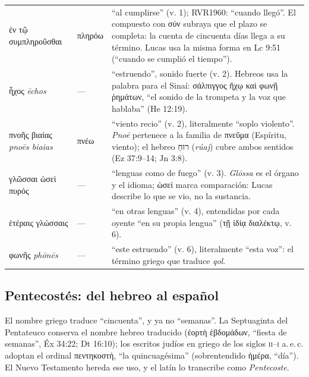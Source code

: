 \documentclass[11pt,letterpaper]{article}
\newcommand{\heb}[1]{\mbox{\foreignlanguage{hebrew}{#1}}}
\newcommand{\grc}[1]{\foreignlanguage{ancientgreek}{#1}}
\begin{document}
\begin{filologia}[Hch 2:1--6]
\begin{tabular}{@{}L{3.5cm}L{1.3cm}L{9.85cm}@{}}
\grc{ἐν τῷ συμπληροῦσθαι} & \grc{πληρόω} & ``al cumplirse'' (v. 1); RVR1960: ``cuando llegó''. El compuesto con \grc{σύν} subraya que el plazo se completa: la cuenta de cincuenta días llega a su término. Lucas usa la misma forma en Lc 9:51 (``cuando se cumplió el tiempo''). \\[2pt]
\grc{ἦχος} \emph{ēchos} & --- & ``estruendo'', sonido fuerte (v. 2). Hebreos usa la palabra para el Sinaí: \grc{σάλπιγγος ἤχῳ καὶ φωνῇ ῥημάτων}, ``el sonido de la trompeta y la voz que hablaba'' (He 12:19). \\[2pt]
\grc{πνοῆς βιαίας} \emph{pnoēs biaias} & \grc{πνέω} & ``viento recio'' (v. 2), literalmente ``soplo violento''. \emph{Pnoē} pertenece a la familia de \grc{πνεῦμα} (Espíritu, viento); el hebreo \heb{רוּחַ} (\emph{rúaj}) cubre ambos sentidos (Ez 37:9--14; Jn 3:8). \\[2pt]
\grc{γλῶσσαι ὡσεὶ πυρός} & --- & ``lenguas como de fuego'' (v. 3). \emph{Glōssa} es el órgano y el idioma; \grc{ὡσεί} marca comparación: Lucas describe lo que se vio, no la sustancia. \\[2pt]
\grc{ἑτέραις γλώσσαις} & --- & ``en otras lenguas'' (v. 4), entendidas por cada oyente ``en su propia lengua'' (\grc{τῇ ἰδίᾳ διαλέκτῳ}, v. 6). \\[2pt]
\grc{φωνῆς} \emph{phōnēs} & --- & ``este estruendo'' (v. 6), literalmente ``esta voz'': el término griego que traduce \emph{qol}. \\
\end{tabular}
\end{filologia}

\subsection{Pentecostés: del hebreo al español}

El nombre griego traduce ``cincuenta'', y ya no ``semanas''. La Septuaginta del Pentateuco conserva el nombre hebreo traducido (\grc{ἑορτὴ ἑβδομάδων}, ``fiesta de semanas'', Éx 34:22; Dt 16:10); los escritos judíos en griego de los siglos \textsc{ii}--\textsc{i} a.\,e.\,c. adoptan el ordinal \grc{πεντηκοστή}, ``la quincuagésima'' (sobrentendido \grc{ἡμέρα}, ``día''). El Nuevo Testamento hereda ese uso, y el latín lo transcribe como \emph{Pentecoste}.
\end{document}
